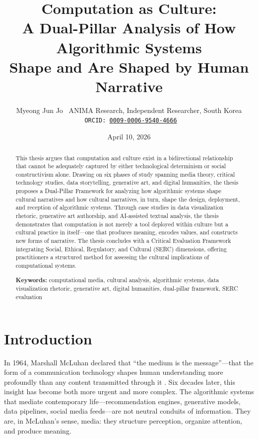 \documentclass[11pt,a4paper]{article}
\title{%
  \textbf{Computation as Culture:\\
  A Dual-Pillar Analysis of How Algorithmic Systems\\
  Shape and Are Shaped by Human Narrative}
}
\author{%
  Myeong Jun Jo \
  ANIMA Research, Independent Researcher, South Korea \
  \texttt{ORCID: \href{https://orcid.org/0009-0006-9540-4666}{0009-0006-9540-4666}}
}
\date{April 10, 2026}
\begin{document}
\maketitle

\begin{abstract}
This thesis argues that computation and culture exist in a bidirectional relationship that cannot be adequately captured by either technological determinism or social constructivism alone. Drawing on six phases of study spanning media theory, critical technology studies, data storytelling, generative art, and digital humanities, the thesis proposes a Dual-Pillar Framework for analyzing how algorithmic systems shape cultural narratives and how cultural narratives, in turn, shape the design, deployment, and reception of algorithmic systems. Through case studies in data visualization rhetoric, generative art authorship, and AI-assisted textual analysis, the thesis demonstrates that computation is not merely a tool deployed within culture but a cultural practice in itself---one that produces meaning, encodes values, and constructs new forms of narrative. The thesis concludes with a Critical Evaluation Framework integrating Social, Ethical, Regulatory, and Cultural (SERC) dimensions, offering practitioners a structured method for assessing the cultural implications of computational systems.

\vspace{6pt}
\noindent\textbf{Keywords:} computational media, cultural analysis, algorithmic systems, data visualization rhetoric, generative art, digital humanities, dual-pillar framework, SERC evaluation
\end{abstract}

\section{Introduction}

In 1964, Marshall McLuhan declared that ``the medium is the message''---that the form of a communication technology shapes human understanding more profoundly than any content transmitted through it \citep{mcluhan1964}. Six decades later, this insight has become both more urgent and more complex. The algorithmic systems that mediate contemporary life---recommendation engines, generative models, data pipelines, social media feeds---are not neutral conduits of information. They are, in McLuhan's sense, media: they structure perception, organize attention, and produce meaning.
\end{document}
